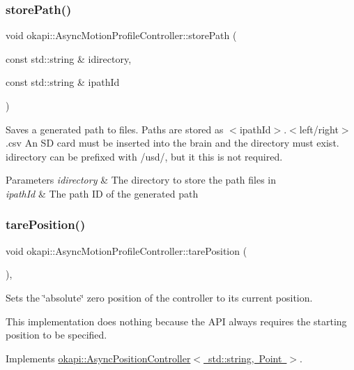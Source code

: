 \subsubsection{\texorpdfstring{storePath()}{storePath()}}
{\footnotesize\ttfamily void okapi\+::\+Async\+Motion\+Profile\+Controller\+::store\+Path (\begin{DoxyParamCaption}\item[{const std\+::string \&}]{idirectory,  }\item[{const std\+::string \&}]{ipath\+Id }\end{DoxyParamCaption})}

Saves a generated path to files. Paths are stored as $<$ipath\+Id$>$.$<$left/right$>$.csv An SD card must be inserted into the brain and the directory must exist. idirectory can be prefixed with /usd/, but it this is not required.


\begin{DoxyParams}{Parameters}
{\em idirectory} & The directory to store the path files in \\
\hline
{\em ipath\+Id} & The path ID of the generated path \\
\hline
\end{DoxyParams}
\mbox{\label{classokapi_1_1AsyncMotionProfileController_afc3476c87e3428f9f166273688e45249}} 
\subsubsection{\texorpdfstring{tarePosition()}{tarePosition()}}
{\footnotesize\ttfamily void okapi\+::\+Async\+Motion\+Profile\+Controller\+::tare\+Position (\begin{DoxyParamCaption}{ }\end{DoxyParamCaption})\hspace{0.3cm}{\ttfamily [override]}, {\ttfamily [virtual]}}

Sets the \char`\"{}absolute\char`\"{} zero position of the controller to its current position.

This implementation does nothing because the A\+PI always requires the starting position to be specified. 

Implements \mbox{\hyperlink{classokapi_1_1AsyncPositionController_a0af03d0035343cbf843a19374f38a059}{okapi\+::\+Async\+Position\+Controller$<$ std\+::string, Point $>$}}.

